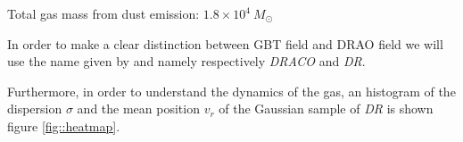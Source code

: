 \documentclass[traditabstract]{aa}
\begin{document}
Total gas mass from dust emission: $1.8\times 10^4\: M_\odot$

In order to make a clear distinction between GBT field and DRAO field we will use the name given by \cite{Martin_2015} and \cite{Blagrave_2017} namely respectively \textit{DRACO} and \textit{DR}.

Furthermore, in order to understand the dynamics of the gas, an histogram of the 
dispersion $\sigma$ and the mean position $v_{r}$ of the Gaussian sample of \textit{DR} is shown figure \ref{fig::heatmap}.


\end{document}
